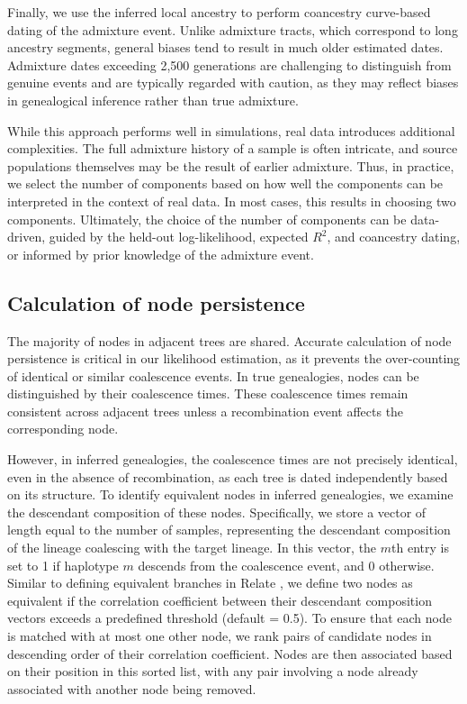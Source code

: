 Finally, we use the inferred local ancestry to perform coancestry curve-based dating of the admixture event. Unlike admixture tracts, which correspond to long ancestry segments, general biases tend to result in much older estimated dates. Admixture dates exceeding 2,500 generations are challenging to distinguish from genuine events and are typically regarded with caution, as they may reflect biases in genealogical inference rather than true admixture.

While this approach performs well in simulations, real data introduces additional complexities. The full admixture history of a sample is often intricate, and source populations themselves may be the result of earlier admixture. Thus, in practice, we select the number of components based on how well the components can be interpreted in the context of real data. In most cases, this results in choosing two components. Ultimately, the choice of the number of components can be data-driven, guided by the held-out log-likelihood, expected $R^2$, and coancestry dating, or informed by prior knowledge of the admixture event.

\subsection{Calculation of node persistence}
\label{sec:ch2-gb-node-persistence}
The majority of nodes in adjacent trees are shared. Accurate calculation of node persistence is critical in our likelihood estimation, as it prevents the over-counting of identical or similar coalescence events. In true genealogies, nodes can be distinguished by their coalescence times. These coalescence times remain consistent across adjacent trees unless a recombination event affects the corresponding node.

However, in inferred genealogies, the coalescence times are not precisely identical, even in the absence of recombination, as each tree is dated independently based on its structure. To identify equivalent nodes in inferred genealogies, we examine the descendant composition of these nodes. Specifically, we store a vector of length equal to the number of samples, representing the descendant composition of the lineage coalescing with the target lineage. In this vector, the $m$th entry is set to 1 if haplotype $m$ descends from the coalescence event, and 0 otherwise. Similar to defining equivalent branches in Relate \cite{speidel2019method}, we define two nodes as equivalent if the correlation coefficient between their descendant composition vectors exceeds a predefined threshold (default = 0.5). To ensure that each node is matched with at most one other node, we rank pairs of candidate nodes in descending order of their correlation coefficient. Nodes are then associated based on their position in this sorted list, with any pair involving a node already associated with another node being removed.

